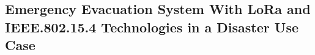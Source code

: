\begin{refsection}
\chapter[21]{Emergency Evacuation System With LoRa and IEEE.802.15.4 Technologies in a Disaster Use Case} %
\printbib
\end{refsection}

